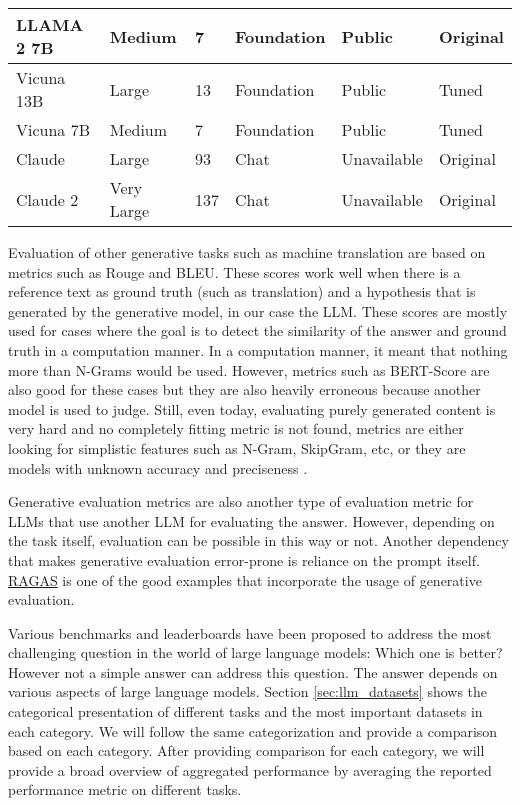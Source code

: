 \documentclass[conference]{IEEEtran}
\begin{document}
\begin{table*}[!ht]
\begin{tabular}{|l|l|l|l|l|l|}
        LLAMA 2 7B & \cellcolor{green!25}Medium & 7 &\cellcolor{gray!25}Foundation & \cellcolor{green!25}Public &  \cellcolor{teal!25}Original\\ \hline
        Vicuna 13B & \cellcolor{yellow!25}Large & 13 & \cellcolor{gray!25}Foundation & \cellcolor{green!25}Public & \cellcolor{pink!25}Tuned \\ \hline
        Vicuna 7B & \cellcolor{green!25}Medium & 7 &\cellcolor{gray!25}Foundation & \cellcolor{green!25}Public & \cellcolor{pink!25}Tuned \\ \hline
        Claude & \cellcolor{yellow!25}Large & 93 &\cellcolor{purple!25}Chat &  \cellcolor{yellow!25}Unavailable & \cellcolor{teal!25}Original \\ \hline
        Claude 2 & \cellcolor{red!25}Very Large & 137 & \cellcolor{purple!25}Chat &  \cellcolor{yellow!25}Unavailable & \cellcolor{teal!25}Original \\ \hline
    \end{tabular}
\end{table*}


Evaluation of other generative tasks such as machine translation are based on metrics such as Rouge and BLEU. These scores work well when there is a reference text as ground truth (such as translation) and a hypothesis that is generated by the generative model, in our case the LLM. These scores are mostly used for cases where the goal is to detect the similarity of the answer and ground truth in a computation manner. In a computation manner, it meant that nothing more than N-Grams would be used. However, metrics such as BERT-Score are also good for these cases but they are also heavily erroneous because another model is used to judge. Still, even today, evaluating purely generated content is very hard and no completely fitting metric is not found, metrics are either looking for simplistic features such as N-Gram, SkipGram, etc, or they are models with unknown accuracy and preciseness \cite{lee2023survey}.

Generative evaluation metrics are also another type of evaluation metric for LLMs that use another LLM for evaluating the answer. However, depending on the task itself, evaluation can be possible in this way or not. Another dependency that makes generative evaluation error-prone is reliance on the prompt itself. \hyperlink{https://docs.ragas.io/en/stable/}{RAGAS} is one of the good examples that incorporate the usage of generative evaluation. 

Various benchmarks and leaderboards have been proposed to address the most challenging question in the world of large language models: Which one is better? However not a simple answer can address this question. The answer depends on various aspects of large language models. Section \ref{sec:llm_datasets} shows the categorical presentation of different tasks and the most important datasets in each category. We will follow the same categorization and provide a comparison based on each category. After providing comparison for each category, we will provide a broad overview of aggregated performance  by averaging the reported performance metric on different tasks. 
\end{document}
